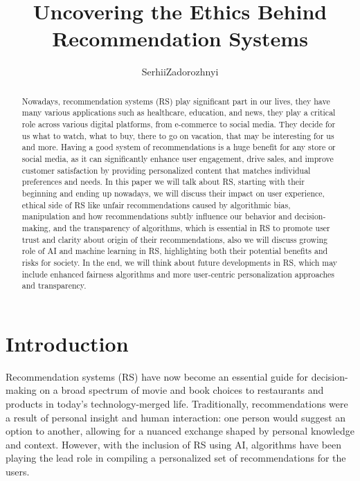 \documentclass{article}
\title{Uncovering the Ethics Behind Recommendation Systems}
\author{Serhii\;Zadorozhnyi}
\begin{document}
\maketitle
\textbf{}

\begin{abstract}
Nowadays, recommendation systems (RS) play significant part in our lives, they have many various applications such as healthcare, education, and news, they play a critical role across various digital platforms, from e-commerce to social media. They decide for us what to watch, what to buy, there to go on vacation, that may be interesting for us and more. Having a good system of recommendations is a huge benefit for any store or social media, as it can significantly enhance user engagement, drive sales, and improve customer satisfaction by providing personalized content that matches individual preferences and needs. In this paper we will talk about RS, starting with their beginning and ending up nowadays, we will discuss their impact on user experience, ethical side of RS like unfair recommendations caused by algorithmic bias, manipulation and how recommendations subtly influence our behavior and decision-making, and the transparency of algorithms, which is essential in RS to promote user trust and clarity about origin of their recommendations, also we will discuss growing role of AI and machine learning in RS, highlighting both their potential benefits and risks for society. In the end, we will think about future developments in RS, which may include enhanced fairness algorithms and more user-centric personalization approaches and transparency.
\end{abstract}

\section{Introduction}
Recommendation systems (RS) have now become an essential guide for decision-making on a broad spectrum of movie and book choices to restaurants and products in today's technology-merged life. Traditionally, recommendations were a result of personal insight and human interaction: one person would suggest an option to another, allowing for a nuanced exchange shaped by personal knowledge and context. However, with the inclusion of RS using AI, algorithms have been playing the lead role in compiling a personalized set of recommendations for the users.
\end{document}
